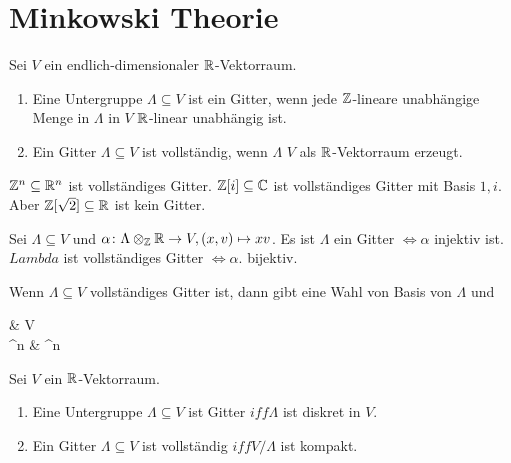 \chapter{Minkowski Theorie}
\begin{Def} Sei \(V\) ein endlich-dimensionaler \(\mathbb{R}\)-Vektorraum.
	\begin{enumerate}
		\item Eine Untergruppe \(\Lambda\subseteq V\) ist ein Gitter, wenn jede \(\mathbb{Z}\)-lineare unabhängige Menge in 
		\(\Lambda\) in \(V\) \(\mathbb{R}\)-linear unabhängig ist.
		\item Ein Gitter \(\Lambda\subseteq V\) ist vollständig, wenn \(\Lambda\) \(V\) als \(\mathbb{R}\)-Vektorraum erzeugt.
	\end{enumerate}
	
\end{Def}
\begin{Bsp}
	\(\mathbb{Z}^n\subseteq \mathbb{R}^n\) ist vollständiges Gitter. \(\mathbb{Z}[i]\subseteq\mathbb{C}\) ist vollständiges Gitter mit Basis \(1,i\). Aber \(\mathbb{Z}[\sqrt 2]\subseteq \mathbb{R}\) ist kein Gitter.
\end{Bsp}
\begin{Bem}
	Sei \(\Lambda\subseteq V\) und \(\alpha\colon\Lambda \otimes_{\mathbb{Z}}\mathbb{R}\to V,(x,v)\mapsto xv\).
	Es ist \(\Lambda\) ein Gitter \(\iff \alpha\) injektiv ist.
	\(Lambda\) ist vollständiges Gitter \(\iff \alpha\). bijektiv.
	
	Wenn \(\Lambda\subseteq V\) vollständiges Gitter ist, dann gibt eine Wahl von Basis von \(\Lambda\) und 
	\begin{tikzfigure}
		\Lambda {} \arrow[r, hook] & V  \\
		\ZZ^n \arrow[r, hook]                                                              & \RR^n                                                       
	\end{tikzfigure}
\end{Bem}
\begin{Satz} Sei \(V\) ein \(\mathbb{R}\)-Vektorraum.
	\begin{enumerate}
		\item Eine Untergruppe \(\Lambda\subseteq V\) ist Gitter \(iff \Lambda\) ist diskret in \(V\).
		\item Ein Gitter \(\Lambda\subseteq V\) ist vollständig \(iff V/\Lambda\) ist kompakt.
	\end{enumerate}
\end{Satz}

